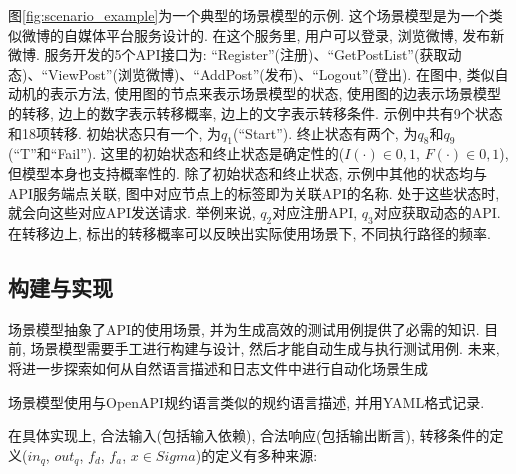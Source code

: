             图\ref{fig:scenario_example}为一个典型的场景模型的示例. 这个场景模型是为一个类似微博的自媒体平台服务设计的. 在这个服务里, 用户可以登录, 浏览微博, 发布新微博. 服务开发的5个API接口为: “Register”(注册)、“GetPostList”(获取动态)、“ViewPost”(浏览微博)、“AddPost”(发布)、“Logout”(登出). 在图中, 类似自动机的表示方法, 使用图的节点来表示场景模型的状态, 使用图的边表示场景模型的转移, 边上的数字表示转移概率, 边上的文字表示转移条件. 示例中共有9个状态和18项转移. 初始状态只有一个, 为$q_1$(“Start”). 终止状态有两个, 为$q_8$和$q_9$(“T”和“Fail”). 这里的初始状态和终止状态是确定性的($I(\cdot) \in {0,1}$, $F(\cdot) \in {0,1}$), 但模型本身也支持概率性的. 除了初始状态和终止状态, 示例中其他的状态均与API服务端点关联, 图中对应节点上的标签即为关联API的名称. 处于这些状态时, 就会向这些对应API发送请求. 举例来说, $q_2$对应注册API, $q_3$对应获取动态的API. 在转移边上, 标出的转移概率可以反映出实际使用场景下, 不同执行路径的频率.
        
        \subsection{构建与实现}
            场景模型抽象了API的使用场景, 并为生成高效的测试用例提供了必需的知识. 目前, 场景模型需要手工进行构建与设计, 然后才能自动生成与执行测试用例. 未来, 将进一步探索如何从自然语言描述和日志文件中进行自动化场景生成
            
            场景模型使用与OpenAPI规约语言类似的规约语言描述, 并用YAML格式记录.
            
            在具体实现上, 合法输入(包括输入依赖), 合法响应(包括输出断言), 转移条件的定义($in_q$, $out_q$, $f_d$, $f_a$, $x \in Sigma$)的定义有多种来源:
            

